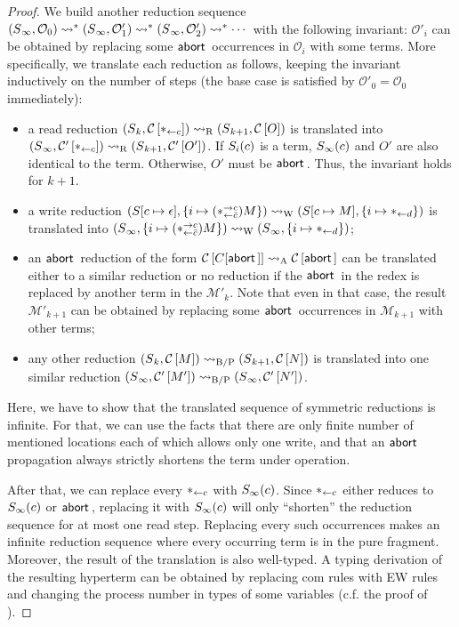 \begin{proof}
We build another reduction sequence
$
({S}{_\infty},{\mathcal{O}_0})
\rightsquigarrow^\ast
({S}{_\infty},{\mathcal{O}'_1})
\rightsquigarrow^\ast
({S}{_\infty},{\mathcal{O}'_2})
\rightsquigarrow^\ast\cdots
$
with the following invariant:
$\mathcal O'_i$ can be obtained by replacing some $\mathsf{abort\,}$ occurrences
in $\mathcal O_i$ with some terms.
More specifically, we translate each reduction as follows, keeping the
invariant inductively on the number of steps
(the base case is satisfied by $\mathcal O'_0 = \mathcal O_0$ immediately):
\begin{itemize}
 \item a read reduction $({S}{_k},{{\mathcal{C}}\left[{\ast_{\leftarrow{c}}}\right]})
       \rightsquigarrow_{\mathrm R}
       ({S}{_{k+1}},{{\mathcal{C}}\left[{O}\right]})$ is translated into
       $({S}{_\infty},{{\mathcal{C}'}\left[{\ast_{\leftarrow{c}}}\right]}) \rightsquigarrow_{\mathrm R}
       ({S}{_{k+1}},{{\mathcal{C}'}\left[{O'}\right]})$.
       If ${S}_i(c)$ is a term,
       ${S}_\infty(c)$ and $O'$ are also identical to the term.
       Otherwise, $O'$ must be $\mathsf{abort\,}$.
       Thus, the invariant
       holds for $k+1$.
 \item a write reduction $({S}{[c\mapsto \epsilon]},{\{i\mapsto {(\ast^{\rightarrow {c}}_{\leftarrow{\bar{c}}})M}\}}) \rightsquigarrow_{\mathrm W}
	({S}{[c\mapsto M]},{\{i\mapsto {\ast_{\leftarrow{d}}}\}})
	$ is translated into
       $({S}{_\infty},{\{i\mapsto {(\ast^{\rightarrow {c}}_{\leftarrow{\bar{c}}})M}\}}) \rightsquigarrow_{\mathrm W}
	({S}{_\infty},{\{i\mapsto {\ast_{\leftarrow{d}}}\}})
	$;
 \item an $\mathsf{abort\,}$ reduction of the form
       ${\mathcal{C}}\left[{C[\mathsf{abort\,}]}\right] \rightsquigarrow_{\mathrm A} {\mathcal{C}}\left[{\mathsf{abort\,}}\right]$ can be translated
       either to a similar reduction or no reduction if the $\mathsf{abort\,}$ in
       the redex is replaced by another term in the $\mathcal{M'}_k$.
       Note that even in that case, the result $\mathcal{M'}_{k+1}$ can
       be obtained by replacing some $\mathsf{abort\,}$ occurrences in
       $\mathcal{M}_{k+1}$ with other terms;
 \item any other reduction $({S}{_k},{{\mathcal{C}}\left[{M}\right]}) \rightsquigarrow_{\mathrm{B/P}}
       ({S}{_{k+1}},{{\mathcal{C}}\left[{N}\right]})$
       is translated into one similar reduction
       $({S}{_\infty},{{\mathcal{C}'}\left[{M'}\right]})\rightsquigarrow_{\mathrm{B/P}}
        ({S}{_\infty},{{\mathcal{C}'}\left[{N'}\right]})$.
\end{itemize}
Here, we have to show that the translated sequence of symmetric
reductions is infinite.
For that, we can use the facts that there are only finite
number of mentioned locations each of which allows only one write,
 and that an $\mathsf{abort\,}$ propagation always
strictly shortens the term under operation.

 After that, we can replace
 every ${\ast_{\leftarrow{c}}}$ with
 ${S}_\infty(c)$.
 Since $\ast_{\leftarrow{c}}$ either reduces to ${S}_\infty(c)$ or $\mathsf{abort\,}$,
 replacing it with ${S}_\infty(c)$ will only ``shorten'' the reduction
 sequence for at most one read step.
 Replacing every such occurrences
 makes an infinite reduction sequence where every occurring term is
 in the pure fragment.
 Moreover,
 the result of the translation is also well-typed.
 A typing derivation of the resulting hyperterm can be obtained by
 replacing com rules with EW rules and changing the process number in
 types of some variables (c.f. the proof of ).


\end{proof}
